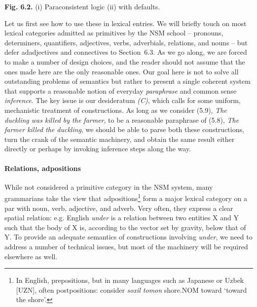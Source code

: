 \begin{center}
{\bf Fig. 6.2.} (i) Paraconsistent logic (ii) with defaults.
\end{center}

\smallskip\noindent Let us first see how to use these in lexical entries.  We
will briefly touch on most lexical categories admitted as primitives by the
NSM school -- pronouns, determiners, quantifiers,
adjectives, verbs, adverbials, relations, and nouns -- but defer adadjectives
and connectives to Section~6.3. As we go along, we are forced to make a number
of design choices, and the reader should not assume that the ones made here
are the only reasonable ones. Our goal here is not to solve all outstanding
problems of semantics but rather to present a single coherent system that
supports a reasonable notion of everyday {\it paraphrase} and common sense
{\it inference}. The key issue is our desideratum {\sl (C)}, which calls for
some uniform, mechanistic treatment of constructions. As long as we consider
(5.9), {\it The duckling was killed by the farmer}, to be a reasonable
paraphrase of (5.8), {\it The farmer killed the duckling}, we should be able
to parse both these constructions, turn the crank of the semantic machinery,
and obtain the same result either directly or perhaps by invoking inference
steps along the way.

\paragraph{Relations, adpositions}

While not considered a primitive category in the NSM system, many grammarians
take the view that adpositions\footnote{In English, prepositions, but in many
languages such as Japanese or Uzbek [UZN], often postpositions: consider {\it
soxil tomon} shore.NOM toward `toward the shore'.} form a major lexical
category on a par with noun, verb, adjective, and adverb.  Very often, they
express a clear spatial relation: e.g. English {\it under} is a relation
between two entities X and Y such that the body of X is, according to the
vector set by gravity, below that of Y. To provide an adequate semantics of
constructions involving {\it under}, we need to address a number of technical
issues, but most of the machinery will be required elsewhere as well.

